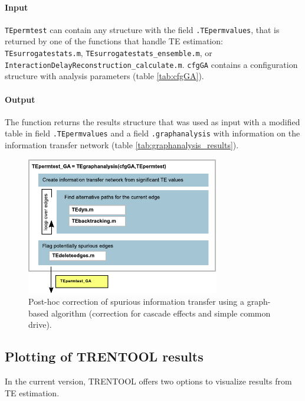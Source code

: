 \documentclass[a4paper,10pt]{article}
\begin{document}
\paragraph*{Input} \texttt{TEpermtest} can contain any structure with the field \verb&.TEpermvalues&, that is returned by one of the functions that handle TE estimation: \verb&TEsurrogatestats.m&, \verb&TEsurrogatestats_ensemble.m&, or \verb&InteractionDelayReconstruction_calculate.m&. \verb&cfgGA& contains a configuration structure with analysis parameters (table \ref{tab:cfgGA}).

\paragraph*{Output} The function returns the results structure that was used as input with a modified table in field \verb&.TEpermvalues& and a field \verb&.graphanalysis& with information on the information transfer network (table \ref{tab:graphanalysis_results}). 

\begin{figure}[H]	
	\centering 
 		\includegraphics[width=0.75\textwidth]{figures/TRENTOOL3_graphanalysis.pdf}
	\caption[Graph based correction of spurious information transfer]{Post-hoc correction of spurious information transfer using a graph-based algorithm (correction for cascade effects and simple common drive).}
	\label{fig:graphanalysis}
\end{figure} 


\subsection{Plotting of TRENTOOL results}

In the current version, TRENTOOL offers two options to visualize results from TE estimation. 
\end{document}
